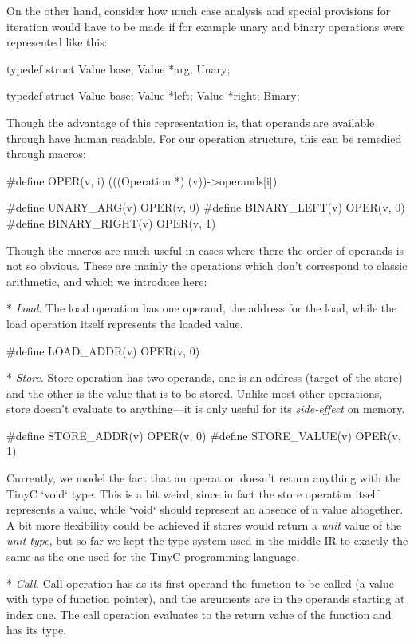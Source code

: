 On the other hand, consider how much case analysis and special provisions for
iteration would have to be made if for example unary and binary operations were
represented like this:

\begtt
typedef struct {
	Value base;
	Value *arg;
} Unary;

typedef struct {
	Value base;
	Value *left;
	Value *right;
} Binary;
\endtt

Though the advantage of this representation is, that operands are available
through have human readable. For our operation structure, this can be remedied
through macros:

\begtt
#define OPER(v, i) (((Operation *) (v))->operands[i])

#define UNARY_ARG(v)     OPER(v, 0)
#define BINARY_LEFT(v)   OPER(v, 0)
#define BINARY_RIGHT(v)  OPER(v, 1)
\endtt

Though the macros are much useful in cases where there the order of operands is
not so obvious. These are mainly the operations which don't correspond to
classic arithmetic, and which we introduce here:

\begitems

* {\em Load}. The load operation has one operand, the address for the load,
while the load operation itself represents the loaded value.

\begtt
#define LOAD_ADDR(v) OPER(v, 0)
\endtt

* {\em Store}. Store operation has two operands, one is an address (target of
the store) and the other is the value that is to be stored. Unlike most other
operations, store doesn't evaluate to anything---it is only useful for its
{\em side-effect} on memory.

\begtt
#define STORE_ADDR(v)  OPER(v, 0)
#define STORE_VALUE(v) OPER(v, 1)
\endtt

Currently, we model the fact that an operation doesn't return anything with the
TinyC `void` type. This is a bit weird, since in fact the store operation itself
represents a value, while `void` should represent an absence of a value
altogether. A bit more flexibility could be achieved if stores would return a
{\em unit} value of the {\em unit type}, but so far we kept the type system used
in the middle IR to exactly the same as the one used for the TinyC programming
language.

* {\em Call}. Call operation has as its first operand the function to be called
(a value with type of function pointer), and the arguments are in the operands
starting at index one. The call operation evaluates to the return value of the
function and has its type.

